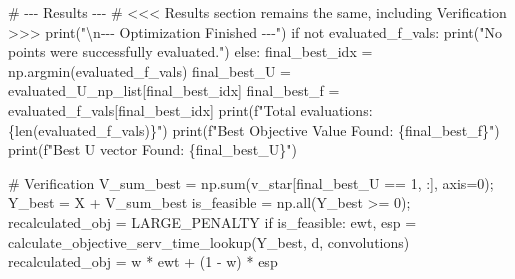 \documentclass[
  letterpaper,
  DIV=11,
  numbers=noendperiod]{scrartcl}
\newenvironment{Shaded}{\begin{snugshade}}{\end{snugshade}}
\newcommand{\BuiltInTok}[1]{\textcolor[rgb]{0.00,0.23,0.31}{#1}}
\newcommand{\CharTok}[1]{\textcolor[rgb]{0.13,0.47,0.30}{#1}}
\newcommand{\CommentTok}[1]{\textcolor[rgb]{0.37,0.37,0.37}{#1}}
\newcommand{\ControlFlowTok}[1]{\textcolor[rgb]{0.00,0.23,0.31}{#1}}
\newcommand{\DecValTok}[1]{\textcolor[rgb]{0.68,0.00,0.00}{#1}}
\newcommand{\KeywordTok}[1]{\textcolor[rgb]{0.00,0.23,0.31}{#1}}
\newcommand{\NormalTok}[1]{\textcolor[rgb]{0.00,0.23,0.31}{#1}}
\newcommand{\OperatorTok}[1]{\textcolor[rgb]{0.37,0.37,0.37}{#1}}
\newcommand{\SpecialCharTok}[1]{\textcolor[rgb]{0.37,0.37,0.37}{#1}}
\newcommand{\SpecialStringTok}[1]{\textcolor[rgb]{0.13,0.47,0.30}{#1}}
\newcommand{\StringTok}[1]{\textcolor[rgb]{0.13,0.47,0.30}{#1}}
\begin{document}
\begin{Shaded}
\begin{Highlighting}[]
\CommentTok{\# {-}{-}{-} Results {-}{-}{-}}
\CommentTok{\# \textless{}\textless{}\textless{} Results section remains the same, including Verification \textgreater{}\textgreater{}\textgreater{}}
\BuiltInTok{print}\NormalTok{(}\StringTok{"}\CharTok{\textbackslash{}n}\StringTok{{-}{-}{-} Optimization Finished {-}{-}{-}"}\NormalTok{)}
\ControlFlowTok{if} \KeywordTok{not}\NormalTok{ evaluated\_f\_vals: }\BuiltInTok{print}\NormalTok{(}\StringTok{"No points were successfully evaluated."}\NormalTok{)}
\ControlFlowTok{else}\NormalTok{:}
\NormalTok{    final\_best\_idx }\OperatorTok{=}\NormalTok{ np.argmin(evaluated\_f\_vals)}
\NormalTok{    final\_best\_U }\OperatorTok{=}\NormalTok{ evaluated\_U\_np\_list[final\_best\_idx]}
\NormalTok{    final\_best\_f }\OperatorTok{=}\NormalTok{ evaluated\_f\_vals[final\_best\_idx]}
    \BuiltInTok{print}\NormalTok{(}\SpecialStringTok{f"Total evaluations: }\SpecialCharTok{\{}\BuiltInTok{len}\NormalTok{(evaluated\_f\_vals)}\SpecialCharTok{\}}\SpecialStringTok{"}\NormalTok{)}
    \BuiltInTok{print}\NormalTok{(}\SpecialStringTok{f"Best Objective Value Found: }\SpecialCharTok{\{}\NormalTok{final\_best\_f}\SpecialCharTok{\}}\SpecialStringTok{"}\NormalTok{)}
    \BuiltInTok{print}\NormalTok{(}\SpecialStringTok{f"Best U vector Found: }\SpecialCharTok{\{}\NormalTok{final\_best\_U}\SpecialCharTok{\}}\SpecialStringTok{"}\NormalTok{)}

    \CommentTok{\# Verification}
\NormalTok{    V\_sum\_best }\OperatorTok{=}\NormalTok{ np.}\BuiltInTok{sum}\NormalTok{(v\_star[final\_best\_U }\OperatorTok{==} \DecValTok{1}\NormalTok{, :], axis}\OperatorTok{=}\DecValTok{0}\NormalTok{)}\OperatorTok{;}\NormalTok{ Y\_best }\OperatorTok{=}\NormalTok{ X }\OperatorTok{+}\NormalTok{ V\_sum\_best}
\NormalTok{    is\_feasible }\OperatorTok{=}\NormalTok{ np.}\BuiltInTok{all}\NormalTok{(Y\_best }\OperatorTok{\textgreater{}=} \DecValTok{0}\NormalTok{)}\OperatorTok{;}\NormalTok{ recalculated\_obj }\OperatorTok{=}\NormalTok{ LARGE\_PENALTY}
    \ControlFlowTok{if}\NormalTok{ is\_feasible:}
\NormalTok{        ewt, esp }\OperatorTok{=}\NormalTok{ calculate\_objective\_serv\_time\_lookup(Y\_best, d, convolutions)}
\NormalTok{        recalculated\_obj }\OperatorTok{=}\NormalTok{ w }\OperatorTok{*}\NormalTok{ ewt }\OperatorTok{+}\NormalTok{ (}\DecValTok{1} \OperatorTok{{-}}\NormalTok{ w) }\OperatorTok{*}\NormalTok{ esp}


\end{Highlighting}
\end{Shaded}
\end{document}
